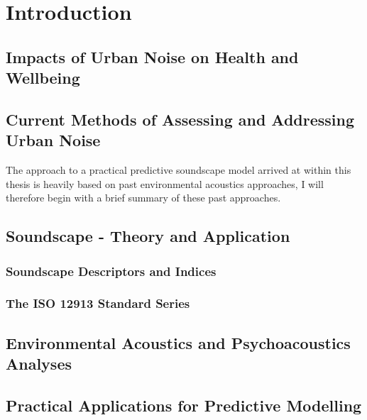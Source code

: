 \documentclass[twoside,fontsize=12pt,titlepage]{scrbook}
\begin{document}

\chapter{Introduction}

\section{Impacts of Urban Noise on Health and Wellbeing}

\section{Current Methods of Assessing and Addressing Urban Noise}
 The approach to a practical predictive soundscape model arrived at within this thesis is heavily based on past environmental acoustics approaches, I will therefore begin with a brief summary of these past approaches.

\section{Soundscape - Theory and Application}
 \subsection{Soundscape Descriptors and Indices}
       \citep{Aletta2016Soundscape}

 \subsection{The ISO 12913 Standard Series}
\section{Environmental Acoustics and Psychoacoustics Analyses}

\section{Practical Applications for Predictive Modelling}
\end{document}
